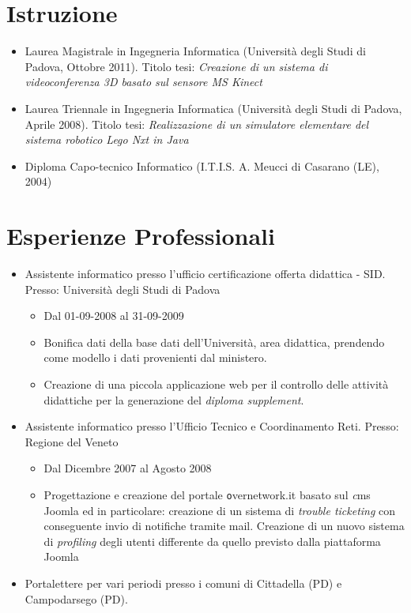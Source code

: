 \documentclass[pdftex,a4paper,12pt,twoside,titlepage,italian,openright]{article}
\begin{document}
\section*{Istruzione}
\begin{itemize}
	\item Laurea Magistrale in Ingegneria Informatica (Università degli Studi di Padova, Ottobre 2011).
	Titolo tesi: {\itshape Creazione di un sistema di videoconferenza 3D basato sul sensore MS Kinect}
	\item Laurea Triennale in Ingegneria Informatica 
	(Università degli Studi di Padova, Aprile 2008). Titolo tesi:
	{\itshape Realizzazione di un simulatore elementare del sistema robotico Lego Nxt
	in Java}
	\item Diploma Capo-tecnico Informatico (I.T.I.S. A. Meucci di Casarano (LE), 2004)
\end{itemize}
\section*{Esperienze Professionali}
\begin{itemize}
	\item Assistente informatico presso l'ufficio certificazione offerta didattica - SID.
	Presso: Università degli Studi di Padova
	\begin{itemize}
		\item Dal 01-09-2008 al 31-09-2009 
		\item Bonifica dati della base dati dell'Università, area didattica, prendendo come 
		modello i dati provenienti dal ministero.
		\item Creazione di una piccola applicazione web per il controllo delle attività didattiche
		per la generazione del \textit{diploma supplement}.
	\end{itemize}
	\item Assistente informatico presso l'Ufficio Tecnico e Coordinamento Reti. Presso:
	Regione del Veneto
	\begin{itemize}
		\item Dal Dicembre 2007 al Agosto 2008
		\item Progettazione e creazione del portale {\texttt overnetwork.it} basato sul {\textit cms Joomla}
		ed in particolare: creazione di un sistema di \textit{trouble ticketing} con conseguente 
		invio di notifiche tramite mail. Creazione di un nuovo sistema di \textit{profiling}
		degli utenti differente da quello previsto dalla piattaforma Joomla
	\end{itemize}
	\item Portalettere per vari periodi presso i comuni di Cittadella (PD) e Campodarsego (PD).
\end{itemize}
\end{document}
